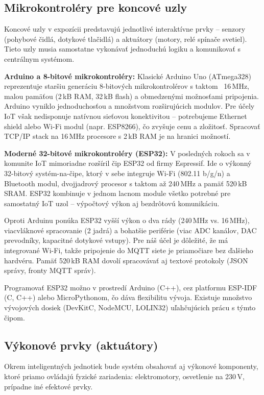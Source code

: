 \subsection{Mikrokontroléry pre koncové uzly}
\label{mikrokontrolery}

Koncové uzly v expozícii predstavujú jednotlivé interaktívne prvky -- senzory (pohybové čidlá, dotykové tlačidlá) a aktuátory (motory, relé spínače svetiel). Tieto uzly musia samostatne vykonávať jednoduchú logiku a komunikovať s centrálnym systémom.

\textbf{Arduino a 8-bitové mikrokontroléry:} Klasické Arduino Uno (ATmega328) reprezentuje staršiu generáciu 8-bitových mikrokontrolérov s taktom ~16\,MHz, malou pamäťou (2\,kB RAM, 32\,kB flash) a obmedzenými možnosťami pripojenia. Arduino vyniklo jednoduchosťou a množstvom rozširujúcich modulov. Pre účely IoT však nedisponuje natívnou sieťovou konektivitou -- potrebujeme Ethernet shield alebo Wi-Fi modul (napr. ESP8266), čo zvyšuje cenu a zložitosť. Spracovať TCP/IP stack na 16\,MHz procesore s 2\,kB RAM je na hranici možností.

\textbf{Moderné 32-bitové mikrokontroléry (ESP32):} V posledných rokoch sa v komunite IoT mimoriadne rozšíril čip ESP32 od firmy Espressif. Ide o výkonný 32-bitový systém-na-čipe, ktorý v sebe integruje Wi-Fi (802.11 b/g/n) a Bluetooth modul, dvojjadrový procesor s taktom až 240\,MHz a pamäť 520\,kB SRAM. ESP32 kombinuje v jednom lacnom module všetko potrebné pre samostatný IoT uzol -- výpočtový výkon aj bezdrôtovú komunikáciu.

Oproti Arduinu ponúka ESP32 vyšší výkon o dva rády (240\,MHz vs. 16\,MHz), viacvláknové spracovanie (2 jadrá) a bohatšie periférie (viac ADC kanálov, DAC prevodníky, kapacitné dotykové vstupy). Pre náš účel je dôležité, že má integrované Wi-Fi, takže pripojenie do MQTT siete je priamočiare bez ďalšieho hardvéru. Pamäť 520\,kB RAM dovolí spracovávať aj textové protokoly (JSON správy, fronty MQTT správ).

Programovať ESP32 možno v prostredí Arduino (C++), cez platformu ESP-IDF (C, C++) alebo MicroPythonom, čo dáva flexibilitu vývoja. Existuje množstvo vývojových dosiek (DevKitC, NodeMCU, LOLIN32) uľahčujúcich prácu s týmto čipom.

\subsection{Výkonové prvky (aktuátory)}
\label{aktuatory}

Okrem inteligentných jednotiek bude systém obsahovať aj výkonové komponenty, ktoré priamo ovládajú fyzické zariadenia: elektromotory, osvetlenie na 230\,V, prípadne iné efektové prvky.

